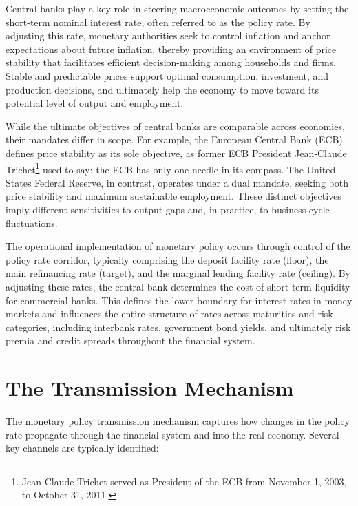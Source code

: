 \documentclass[
  letterpaper,
  DIV=11,
  numbers=noendperiod]{scrreprt}
\begin{document}
Central banks play a key role in steering macroeconomic outcomes by
setting the short-term nominal interest rate, often referred to as the
policy rate. By adjusting this rate, monetary authorities seek to
control inflation and anchor expectations about future inflation,
thereby providing an environment of price stability that facilitates
efficient decision-making among households and firms. Stable and
predictable prices support optimal consumption, investment, and
production decisions, and ultimately help the economy to move toward its
potential level of output and employment.

While the ultimate objectives of central banks are comparable across
economies, their mandates differ in scope. For example, the European
Central Bank (ECB) defines price stability as its sole objective, as
former ECB President Jean‑Claude Trichet\footnote{Jean‑Claude Trichet
  served as President of the ECB from November 1, 2003, to October 31,
  2011.} used to say: the ECB has only one needle in its compass. The
United States Federal Reserve, in contrast, operates under a dual
mandate, seeking both price stability and maximum sustainable
employment. These distinct objectives imply different sensitivities to
output gaps and, in practice, to business-cycle fluctuations.

The operational implementation of monetary policy occurs through control
of the policy rate corridor, typically comprising the deposit facility
rate (floor), the main refinancing rate (target), and the marginal
lending facility rate (ceiling). By adjusting these rates, the central
bank determines the cost of short-term liquidity for commercial banks.
This defines the lower boundary for interest rates in money markets and
influences the entire structure of rates across maturities and risk
categories, including interbank rates, government bond yields, and
ultimately risk premia and credit spreads throughout the financial
system.

\section{The Transmission Mechanism}\label{the-transmission-mechanism}

The monetary policy transmission mechanism captures how changes in the
policy rate propagate through the financial system and into the real
economy. Several key channels are typically identified:
\end{document}
